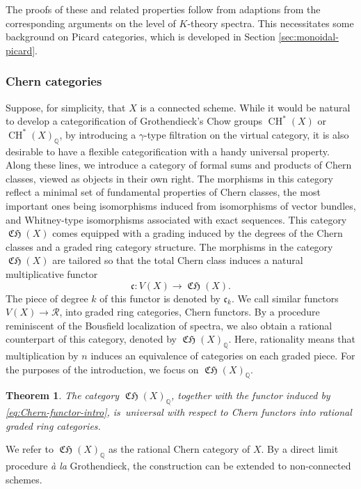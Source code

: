 \documentclass[JEP,XML,SOM,Unicode,published]{cedram}
\theoremstyle{plain}
\newtheorem{thm}{Theorem}
\theoremstyle{definition}
\newcommand{\QBbb}{\mathbb Q}
\newcommand{\Rcal}{\mathcal R}
\newcommand{\cfrak}{\mathfrak c}
\DeclareMathOperator{\CH}{CH}
\DeclareMathOperator{\CHfrak}{\mathfrak{CH}}
\begin{document}
The proofs of these and related properties follow from adaptions from the corresponding arguments on the level of $K$-theory spectra. This necessitates some background on Picard categories, which is developed in Section \ref{sec:monoidal-picard}.

\subsubsection*{Chern categories} Suppose, for simplicity, that $X$ is a connected scheme. While it would be natural to develop a categorification of Grothendieck's Chow groups $\CH^{\ast}(X)$ or $\CH^{\ast}(X)_\QBbb$, by introducing a $\gamma$-type filtration on the virtual category, it is also desirable to have a flexible categorification with a handy universal property. Along these lines, we introduce a category of formal sums and products of Chern classes, viewed as objects in their own right. The morphisms in this category reflect a minimal set of fundamental properties of Chern classes, the most important ones being isomorphisms induced from isomorphisms of vector bundles, and Whitney-type isomorphisms associated with exact sequences. This category $\CHfrak(X)$ comes equipped with a grading induced by the degrees of the Chern classes and a graded ring category structure. The morphisms in the category $\CHfrak(X)$ are tailored so that the total Chern class induces a natural multiplicative functor
\begin{equation}\label{eq:Chern-functor-intro}
\cfrak: V(X) \to \CHfrak(X).
\end{equation}
The piece of degree $k$ of this functor is denoted by $\cfrak_{k}$. We call similar functors \hbox{$ V(X) \to \Rcal$}, into graded ring categories, Chern functors. By a procedure \hbox{reminiscent} of the Bousfield localization of spectra, we also obtain a rational counterpart of this category, denoted by $\CHfrak(X)_{\QBbb}$. Here, rationality means that multiplication by $n$ induces an equivalence of categories on each graded piece. For the purposes of the introduction, we focus on $\CHfrak(X)_\QBbb$.

\begin{thm}\label{thm:B}
The category $\CHfrak(X)_\QBbb$, together with the functor induced by \eqref{eq:Chern-functor-intro}, is~universal with respect to Chern functors into rational graded ring categories.

\end{thm}
We refer to $\CHfrak(X)_\QBbb$ as the rational Chern category of $X$. By a direct limit procedure \emph{à la} Grothendieck, the construction can be extended to non-connected schemes.
\end{document}
